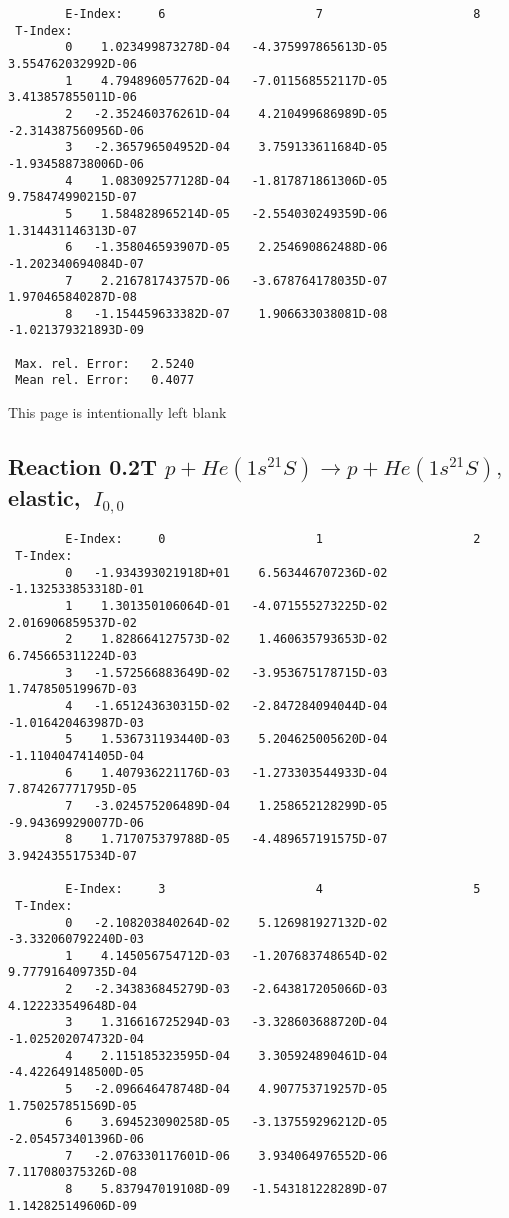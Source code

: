 \documentclass[12pt,dvipdfmx]{article}
\begin{document}
{\begin{small}
\begin{verbatim}
        E-Index:     6                     7                     8
 T-Index:
        0    1.023499873278D-04   -4.375997865613D-05    3.554762032992D-06
        1    4.794896057762D-04   -7.011568552117D-05    3.413857855011D-06
        2   -2.352460376261D-04    4.210499686989D-05   -2.314387560956D-06
        3   -2.365796504952D-04    3.759133611684D-05   -1.934588738006D-06
        4    1.083092577128D-04   -1.817871861306D-05    9.758474990215D-07
        5    1.584828965214D-05   -2.554030249359D-06    1.314431146313D-07
        6   -1.358046593907D-05    2.254690862488D-06   -1.202340694084D-07
        7    2.216781743757D-06   -3.678764178035D-07    1.970465840287D-08
        8   -1.154459633382D-07    1.906633038081D-08   -1.021379321893D-09

 Max. rel. Error:   2.5240
 Mean rel. Error:   0.4077
\end{verbatim}\end{small}

\newpage
This page is intentionally left blank
\newpage

\subsection{
Reaction 0.2T $ p + He(1s^21S) \rightarrow p + He(1s^21S) ,\  $
elastic, $ \  I_{0,0} $
}

\begin{small}\begin{verbatim}
        E-Index:     0                     1                     2
 T-Index:
        0   -1.934393021918D+01    6.563446707236D-02   -1.132533853318D-01
        1    1.301350106064D-01   -4.071555273225D-02    2.016906859537D-02
        2    1.828664127573D-02    1.460635793653D-02    6.745665311224D-03
        3   -1.572566883649D-02   -3.953675178715D-03    1.747850519967D-03
        4   -1.651243630315D-02   -2.847284094044D-04   -1.016420463987D-03
        5    1.536731193440D-03    5.204625005620D-04   -1.110404741405D-04
        6    1.407936221176D-03   -1.273303544933D-04    7.874267771795D-05
        7   -3.024575206489D-04    1.258652128299D-05   -9.943699290077D-06
        8    1.717075379788D-05   -4.489657191575D-07    3.942435517534D-07

        E-Index:     3                     4                     5
 T-Index:
        0   -2.108203840264D-02    5.126981927132D-02   -3.332060792240D-03
        1    4.145056754712D-03   -1.207683748654D-02    9.777916409735D-04
        2   -2.343836845279D-03   -2.643817205066D-03    4.122233549648D-04
        3    1.316616725294D-03   -3.328603688720D-04   -1.025202074732D-04
        4    2.115185323595D-04    3.305924890461D-04   -4.422649148500D-05
        5   -2.096646478748D-04    4.907753719257D-05    1.750257851569D-05
        6    3.694523090258D-05   -3.137559296212D-05   -2.054573401396D-06
        7   -2.076330117601D-06    3.934064976552D-06    7.117080375326D-08
        8    5.837947019108D-09   -1.543181228289D-07    1.142825149606D-09


\end{verbatim}
\end{small}}
\end{document}
